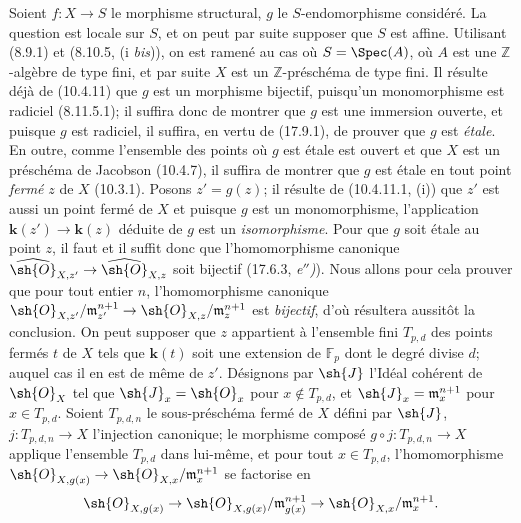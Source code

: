 Soient $f:X\to S$ le morphisme structural, $g$ le $S$-endomorphisme considéré. La question est locale sur $S$, et on peut par suite supposer que $S$ est affine. Utilisant (8.9.1) et (8.10.5, (i \emph{bis})), on est ramené au cas où $S=\Spec(A)$, où $A$ est une $\mathbb{Z}$-algèbre de type fini, et par suite $X$ est un $\mathbb{Z}$-préschéma de type fini. Il résulte déjà de (10.4.11) que $g$ est un morphisme bijectif, puisqu'un monomorphisme est radiciel (8.11.5.1); il suffira donc de montrer
que $g$ est une immersion ouverte, et puisque $g$ est radiciel, il suffira, en vertu de (17.9.1), de prouver que $g$ est \emph{étale}. En outre, comme l'ensemble des points où $g$ est étale est ouvert et que $X$ est un préschéma de Jacobson (10.4.7), il suffira de montrer que $g$ est étale en tout point \emph{fermé} $z$ de $X$ (10.3.1). Posons $z'=g(z)$; il résulte de (10.4.11.1, (i)) que $z'$ est aussi un point fermé de $X$ et puisque $g$ est un monomorphisme, l'application $\boldsymbol{k}(z')\to\boldsymbol{k}(z)$ déduite de $g$ est un \emph{isomorphisme}. Pour que $g$ soit étale au point $z$, il faut et il suffit donc que l'homomorphisme canonique $\widehat{\sh{O}}_{X,z'}\to\widehat{\sh{O}}_{X,z}$ soit bijectif (17.6.3, \emph{e$''$)}). Nous allons pour cela prouver que pour tout entier $n$, l'homomorphisme canonique $\sh{O}_{X,z'}/\mathfrak m_{z'}^{n+1}\to\sh{O}_{X,z}/\mathfrak m_z^{n+1}$ est \emph{bijectif}, d'où résultera aussitôt la conclusion. On peut supposer que $z$ appartient à l'ensemble fini $T_{p,d}$ des points fermés $t$ de $X$ tels que $\boldsymbol{k}(t)$ soit une extension de $\mathbb{F}_p$ dont le degré divise $d$; auquel cas il en est de même de $z'$. Désignons par $\sh{J}$ l'Idéal cohérent de $\sh{O}_X$ tel que $\sh{J}_x=\sh{O}_x$ pour $x\notin T_{p,d}$, et $\sh{J}_x=\mathfrak m_x^{n+1}$ pour $x\in T_{p,d}$. Soient $T_{p,d,n}$ le sous-préschéma fermé de $X$ défini par $\sh{J}$, $j:T_{p,d,n}\to X$ l'injection canonique; le morphisme composé $g\circ j:T_{p,d,n}\to X$ applique l'ensemble $T_{p,d}$ dans lui-même, et pour tout $x\in T_{p,d}$, l'homomorphisme $\sh{O}_{X,g(x)}\to\sh{O}_{X,x}/\mathfrak m_x^{n+1}$ se factorise en
\[
\sh{O}_{X,g(x)}\to\sh{O}_{X,g(x)}/\mathfrak m_{g(x)}^{n+1}\to\sh{O}_{X,x}/\mathfrak m_x^{n+1}.
\]
